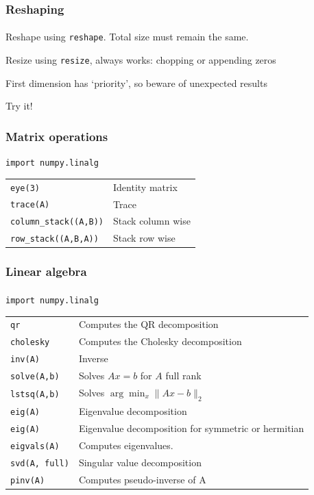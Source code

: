 \begin{frame}\frametitle{Reshaping}
    \framesubtitle{}

    Reshape using \texttt{reshape}.
    Total size must remain the same.

    \vfill\pause

    Resize using \texttt{resize},
    always works: chopping or appending zeros

    First dimension has `priority', so beware of unexpected results

    \vfill\pause

    Try it!

\end{frame}

\begin{frame}\frametitle{Matrix operations}

\texttt{import numpy.linalg}

\begin{table}
\centering
\begin{tabular}{@{}ll@{}}
    \texttt{eye(3)}& Identity matrix\\
    \texttt{trace(A)}& Trace\\
    \texttt{column\_stack((A,B))}& Stack column wise\\
    \texttt{row\_stack((A,B,A))}& Stack row wise
\end{tabular}
\end{table}

\end{frame}

\begin{frame}[fragile]\frametitle{Linear algebra}
    \framesubtitle{}

\texttt{import numpy.linalg}

\begin{table}
\centering
\begin{tabular}{@{}ll@{}}
    \texttt{qr}& Computes the QR decomposition\\
    \texttt{cholesky}& Computes the Cholesky decomposition\\
    \texttt{inv(A)}& Inverse\\
    \texttt{solve(A,b)}& Solves $Ax = b$ for $A$ full rank\\
    \texttt{lstsq(A,b)}& Solves $\arg\min_x \|Ax-b\|_2$\\
    \texttt{eig(A)}& Eigenvalue decomposition\\
    \texttt{eig(A)}& Eigenvalue decomposition for
    symmetric or hermitian\\
    \texttt{eigvals(A)}& Computes eigenvalues.\\
    \texttt{svd(A, full)}& Singular value decomposition\\
    \texttt{pinv(A)}& Computes pseudo-inverse of A
\end{tabular}
\end{table}
\end{frame}

